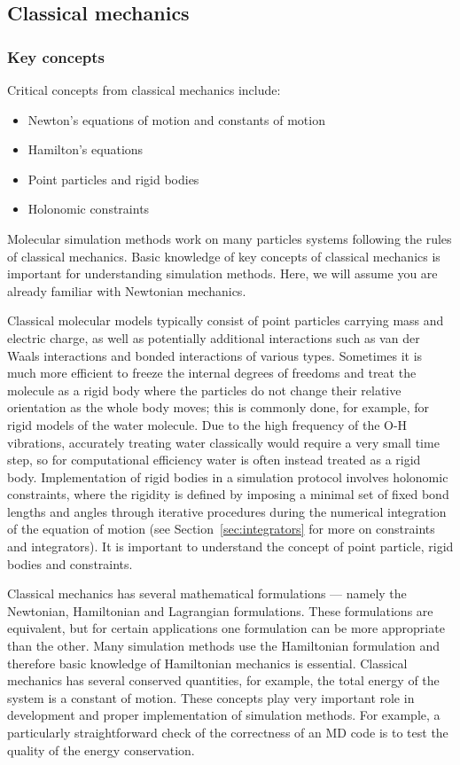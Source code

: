 \documentclass[9pt,bestpractices]{livecoms}
\begin{document}
\subsection{Classical mechanics}
\label{sec:classical_mechanics}
\subsubsection{Key concepts}

Critical concepts from classical mechanics include:
\begin{itemize}
\item Newton's equations of motion and constants of motion
\item Hamilton's equations
\item Point particles and rigid bodies
\item Holonomic constraints
\end{itemize}

Molecular simulation methods work on many particles systems following the rules of classical mechanics. 
Basic knowledge of key concepts of classical mechanics is important for understanding simulation methods.
Here, we will assume you are already familiar with Newtonian mechanics.

Classical molecular models typically consist of point particles carrying mass and electric charge, as well as potentially additional interactions such as van der Waals interactions and bonded interactions of various types.
Sometimes it is much more efficient to freeze the internal degrees of freedoms and treat the molecule as a rigid body where the particles do not change their relative orientation as the whole body moves; this is commonly done, for example, for rigid models of the water molecule.
Due to the high frequency of the O-H vibrations, accurately treating water classically would require a very small time step, so for computational efficiency water is often instead treated as a rigid body.
Implementation of rigid bodies in a simulation protocol involves holonomic constraints, where the rigidity is defined by imposing a minimal set of fixed bond lengths and angles through iterative procedures during the numerical integration of the equation of motion (see Section~\ref{sec:integrators} for more on constraints and integrators).
It is important to understand the concept of point particle, rigid bodies and constraints.

Classical mechanics has several mathematical formulations --- namely the Newtonian, Hamiltonian and Lagrangian formulations.
These formulations are equivalent, but for certain applications one formulation can be more appropriate than the other. 
Many simulation methods use the Hamiltonian formulation and therefore basic knowledge of Hamiltonian mechanics is essential.
Classical mechanics has several conserved quantities, for example, the total energy of the system is a constant of motion.
These concepts play very important role in development and proper implementation of simulation methods.
For example, a particularly straightforward check of the correctness of an MD code is to test the quality of the energy conservation.
\end{document}

